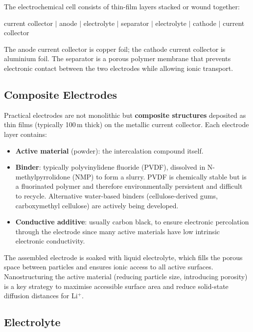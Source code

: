 The electrochemical cell consists of thin-film layers stacked or wound together:

\begin{center}
    current collector $\mid$ anode $\mid$ electrolyte $\mid$ separator $\mid$ electrolyte $\mid$ cathode $\mid$ current collector
\end{center}

The anode current collector is copper foil; the cathode current collector is aluminium foil. The separator is a porous polymer membrane that prevents electronic contact between the two electrodes while allowing ionic transport.

\subsection{Composite Electrodes}

Practical electrodes are not monolithic but \textbf{composite structures} deposited as thin films (typically 100\,\textmu m thick) on the metallic current collector. Each electrode layer contains:

\begin{itemize}
    \item \textbf{Active material} (powder): the intercalation compound itself.
    \item \textbf{Binder}: typically polyvinylidene fluoride (PVDF), dissolved in N-methylpyrrolidone (NMP) to form a slurry. PVDF is chemically stable but is a fluorinated polymer and therefore environmentally persistent and difficult to recycle. Alternative water-based binders (cellulose-derived gums, carboxymethyl cellulose) are actively being developed.
    \item \textbf{Conductive additive}: usually carbon black, to ensure electronic percolation through the electrode since many active materials have low intrinsic electronic conductivity.
\end{itemize}

The assembled electrode is soaked with liquid electrolyte, which fills the porous space between particles and ensures ionic access to all active surfaces. Nanostructuring the active material (reducing particle size, introducing porosity) is a key strategy to maximise accessible surface area and reduce solid-state diffusion distances for Li$^+$.

\subsection{Electrolyte}

